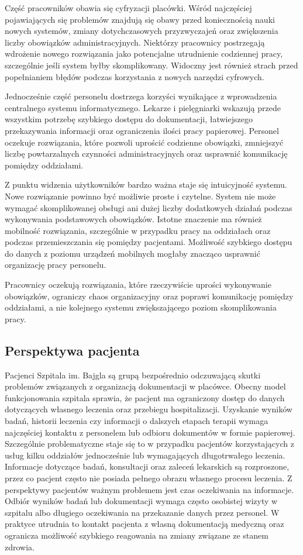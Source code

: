 Część pracowników obawia się cyfryzacji placówki. Wśród najczęściej pojawiających się problemów znajdują się obawy przed koniecznością nauki nowych systemów, zmiany dotychczasowych przyzwyczajeń oraz zwiększenia liczby obowiązków administracyjnych. Niektórzy pracownicy postrzegają wdrożenie nowego rozwiązania jako potencjalne utrudnienie codziennej pracy, szczególnie jeśli system byłby skomplikowany. Widoczny jest również strach przed popełnianiem błędów podczas korzystania z nowych narzędzi cyfrowych.

Jednocześnie część personelu dostrzega korzyści wynikające z wprowadzenia centralnego systemu informatycznego. Lekarze i pielęgniarki wskazują przede wszystkim potrzebę szybkiego dostępu do dokumentacji, łatwiejszego przekazywania informacji oraz ograniczenia ilości pracy papierowej. Personel oczekuje rozwiązania, które pozwoli uprościć codzienne obowiązki, zmniejszyć liczbę powtarzalnych czynności administracyjnych oraz usprawnić komunikację pomiędzy oddziałami.

Z punktu widzenia użytkowników bardzo ważna staje się intuicyjność systemu. Nowe rozwiązanie powinno być możliwie proste i czytelne. System nie może wymagać skomplikowanej obsługi ani dużej liczby dodatkowych działań podczas wykonywania podstawowych obowiązków. Istotne znaczenie ma również mobilność rozwiązania, szczególnie w przypadku pracy na oddziałach oraz podczas przemieszczania się pomiędzy pacjentami. Możliwość szybkiego dostępu do danych z poziomu urządzeń mobilnych mogłaby znacząco usprawnić organizację pracy personelu.

Pracownicy oczekują rozwiązania, które rzeczywiście uprości wykonywanie obowiązków, ograniczy chaos organizacyjny oraz poprawi komunikację pomiędzy oddziałami, a nie kolejnego systemu zwiększającego poziom skomplikowania pracy.
\subsection{Perspektywa pacjenta}
Pacjenci Szpitala im. Bajgla są grupą bezpośrednio odczuwającą skutki problemów związanych z organizacją dokumentacji w placówce. Obecny model funkcjonowania szpitala sprawia, że pacjent ma ograniczony dostęp do danych dotyczących własnego leczenia oraz przebiegu hospitalizacji. Uzyskanie wyników badań, historii leczenia czy informacji o dalszych etapach terapii wymaga najczęściej kontaktu z personelem lub odbioru dokumentów w formie papierowej.
Szczególnie problematyczne staje się to w przypadku pacjentów korzystających z usług kilku oddziałów jednocześnie lub wymagających długotrwałego leczenia. Informacje dotyczące badań, konsultacji oraz zaleceń lekarskich są rozproszone, przez co pacjent często nie posiada pełnego obrazu własnego procesu leczenia. Z perspektywy pacjentów ważnym problemem jest czas oczekiwania na informacje. Odbiór wyników badań lub dokumentacji wymaga często osobistej wizyty w szpitalu albo długiego oczekiwania na przekazanie danych przez personel. W praktyce utrudnia to kontakt pacjenta z własną dokumentacją medyczną oraz ogranicza możliwość szybkiego reagowania na zmiany związane ze stanem zdrowia.

